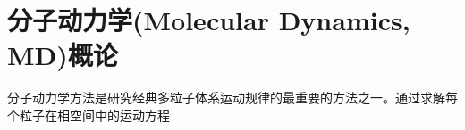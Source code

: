 \chapter{分子动力学(Molecular Dynamics, MD)概论}\label{chap:MD}
分子动力学方法是研究经典多粒子体系运动规律的最重要的方法之一。通过求解每个粒子在相空间中的运动方程
